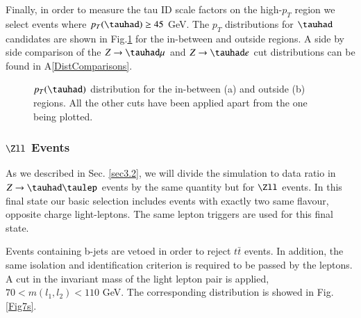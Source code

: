 Finally, in order to measure the tau ID scale factors on the high-$p_T$ region we select events where $p_T(\tauhad)\geq 45$ GeV. The $p_T$ distributions for $\tauhad$ candidates are shown in Fig.\ref{Fig6} for the in-between and outside regions. A side by side comparison of the $Z\to\tauhad\mu$ and $Z\to\tauhad e$ cut distributions can be found in A\ref{DistComparisons}.
\begin{figure}[htbp]
	\centering
	\hfill
	\caption{$p_T(\tauhad)$ distribution for the in-between (a) and outside (b) regions. All the other cuts have been applied apart from the one being plotted.}
	\label{Fig6}
\end{figure} 
\subsubsection{$\Zll$ Events}\label{sec3.3.2}
As we described in Sec. \ref{sec3.2}, we will divide the simulation to data ratio in $Z\to\tauhad\taulep$ events by the same quantity but for $\Zll$ events. In this final state our basic selection includes events with exactly two same flavour, opposite charge light-leptons. The same lepton triggers are used for this final state.

Events containing b-jets are vetoed in order to reject $t\bar{t}$ events. In addition, the same isolation and identification criterion is required to be passed by the leptons. A cut in the invariant mass of the light lepton pair is applied, $70<m(l_1,l_2)<110$ GeV. The corresponding distribution is showed in Fig. \ref{Fig7s}.

